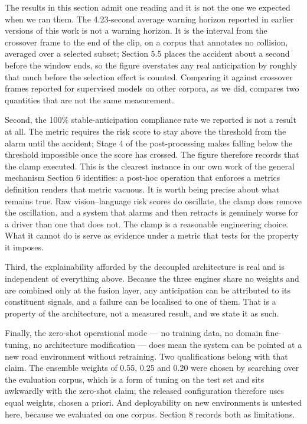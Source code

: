 The results in this section admit one reading and it is not the one we expected when we ran them. The 4.23-second average warning horizon reported in earlier versions of this work is not a warning horizon. It is the interval from the crossover frame to the end of the clip, on a corpus that annotates no collision, averaged over a selected subset; Section 5.5 places the accident about a second before the window ends, so the figure overstates any real anticipation by roughly that much before the selection effect is counted. Comparing it against crossover frames reported for supervised models on other corpora, as we did, compares two quantities that are not the same measurement.

Second, the 100\% stable-anticipation compliance rate we reported is not a result at all. The metric requires the risk score to stay above the threshold from the alarm until the accident; Stage 4 of the post-processing makes falling below the threshold impossible once the score has crossed. The figure therefore records that the clamp executed. This is the clearest instance in our own work of the general mechanism Section 6 identifies: a post-hoc operation that enforces a metric\textquotesingle s definition renders that metric vacuous. It is worth being precise about what remains true. Raw vision--language risk scores do oscillate, the clamp does remove the oscillation, and a system that alarms and then retracts is genuinely worse for a driver than one that does not. The clamp is a reasonable engineering choice. What it cannot do is serve as evidence under a metric that tests for the property it imposes.

Third, the explainability afforded by the decoupled architecture is real and is independent of everything above. Because the three engines share no weights and are combined only at the fusion layer, any anticipation can be attributed to its constituent signals, and a failure can be localised to one of them. That is a property of the architecture, not a measured result, and we state it as such.

Finally, the zero-shot operational mode --- no training data, no domain fine-tuning, no architecture modification --- does mean the system can be pointed at a new road environment without retraining. Two qualifications belong with that claim. The ensemble weights of 0.55, 0.25 and 0.20 were chosen by searching over the evaluation corpus, which is a form of tuning on the test set and sits awkwardly with the zero-shot claim; the released configuration therefore uses equal weights, chosen a priori. And deployability on new environments is untested here, because we evaluated on one corpus. Section 8 records both as limitations.

